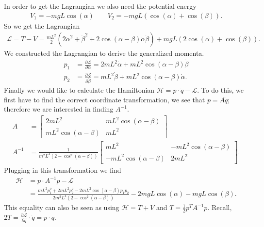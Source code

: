\begin{solution}[8.1]
In order to get the Lagrangian we also need the potential energy
\begin{align}
	V_1 = -mg L \cos (\alpha ) \qquad V_2=- mgL (\cos(\alpha ) + \cos (\beta )).
\end{align}
So we get the Lagrangian
\begin{align}
	\mathcal{L} = T - V = \frac{mL^2}{2} \left( 2\dot{\alpha }^2 + \dot{\beta }^2 + 2 \cos(\alpha -\beta ) \dot{\alpha }\dot{\beta } \right) + mgL\left( 2 \cos(\alpha ) + \cos(\beta ) \right).
\end{align}
We constructed the Lagrangian to derive the generalized momenta.
\begin{align}
	p_1 &= \frac{\partial \mathcal{L}}{\partial \dot{\alpha }} = 2mL^2 \dot{\alpha } + mL^2 \cos(\alpha -\beta ) \dot{\beta }\\
	p_2 &= \frac{\partial \mathcal{L}}{\partial \dot{\beta }} = mL^2 \dot{\beta } + mL^2 \cos(\alpha -\beta ) \dot{\alpha }.
\end{align}
Finally we would like to calculate the Hamiltonian $\mathcal{H} = p \cdot \dot{q} - \mathcal{L}$. To do this, we first have to find the correct coordinate transformation, we see that $p = A \dot{q}$; therefore we are interested in finding $A^{-1}$.
\begin{align}
	A &= 
	\begin{bmatrix}
		2mL^2 & mL^2 \cos(\alpha -\beta ) \\
		mL^2 \cos(\alpha -\beta ) & mL^2
	\end{bmatrix} \\
	A^{-1} &= 
		\frac{1}{m^2 L^4 \left( 2 -  \cos^2(\alpha -\beta ) \right)}
	\begin{bmatrix}
		m L^2 & - mL^2 \cos(\alpha -\beta ) \\
		-m L^2 \cos(\alpha -\beta ) & 2mL^2
	\end{bmatrix}.
\end{align}
Plugging in this transformation we find
\begin{align}
	\mathcal{H} &= p \cdot A^{-1} p - \mathcal{L} \\
		    &= \frac{mL^2 p_1^2 + 2mL^2 p_2^2 - 2mL^2 \cos(\alpha -\beta ) p_1 p_2}{2m^2L^4 \left(2 - \cos^2(\alpha -\beta )\right)} - 2mgL \cos(\alpha ) - mgL \cos(\beta ).
\end{align}
This equality can also be seen as using $\mathcal{H} = T+V$ and  $T = \frac{1}{2} p^T A^{-1} p$. Recall, $2T = \frac{\partial \mathcal{L}}{\partial \dot{q}}\cdot \dot{q} = p \cdot q$.
\end{solution}

